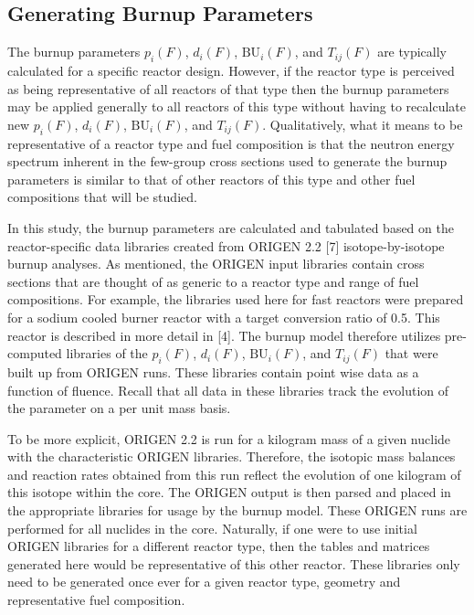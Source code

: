 \subsection{Generating Burnup Parameters}
\label{1g_sec:gen_BU_param}
The burnup parameters $p_i(F)$, $d_i(F)$, $\mbox{BU}_i(F)$, and $T_{ij}(F)$ are typically calculated 
for a specific reactor design.  However, if the reactor type is perceived as being representative of 
all reactors of that type then the burnup parameters may be applied generally to all reactors of this 
type without having to recalculate new $p_i(F)$, $d_i(F)$, $\mbox{BU}_i(F)$, and $T_{ij}(F)$.  
Qualitatively, what it means to be representative of a reactor type and fuel composition is that the 
neutron energy spectrum inherent in the few-group cross sections used to generate the burnup parameters 
is similar to that of other reactors of this type and other fuel compositions that will be studied.   

In this study, the burnup parameters are calculated and tabulated based on the reactor-specific data 
libraries created from ORIGEN 2.2 [7] isotope-by-isotope burnup analyses.  As mentioned, the ORIGEN 
input libraries contain cross sections that are thought of as generic to a reactor type and range of 
fuel compositions.  For example, the libraries used here for fast reactors were prepared for a sodium 
cooled burner reactor with a target conversion ratio of 0.5.  This reactor is described in more detail 
in [4].  The burnup model therefore utilizes pre-computed libraries of the $p_i(F)$, $d_i(F)$, 
$\mbox{BU}_i(F)$, and $T_{ij}(F)$ that were built up from ORIGEN runs.  These libraries contain point 
wise data as a function of fluence.  Recall that all data in these libraries track the evolution of the 
parameter on a per unit mass basis.

To be more explicit, ORIGEN 2.2 is run for a kilogram mass of a given nuclide with the characteristic 
ORIGEN libraries.  Therefore, the isotopic mass balances and reaction rates obtained from this run 
reflect the evolution of one kilogram of this isotope within the core.  The ORIGEN output is then 
parsed and placed in the appropriate libraries for usage by the burnup model.  These ORIGEN runs are 
performed for all nuclides in the core.  Naturally, if one were to use initial ORIGEN libraries for a 
different reactor type, then the tables and matrices generated here would be representative of this 
other reactor.  These libraries only need to be generated once ever for a given reactor type, geometry 
and representative fuel composition.

